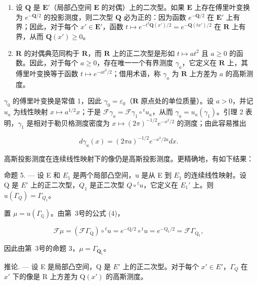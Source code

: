 \begin{enumerate}
\def\labelenumi{\arabic{enumi})}
\setcounter{enumi}{1}
\item
  设 \(\mathbf{Q}\) 是 \(\mathbf{E}'\)（局部凸空间 \(\mathbf{E}\) 的对偶）上的二次型。如果 \(\mathbf{E}\) 上存在傅里叶变换为 \(e^{-\mathbf{Q} / 2}\) 的投影测度，则二次型 \(\mathbf{Q}\) 必为正的：因为函数 \(e^{-\mathbf{Q} / 2}\) 在 \(\mathbf{E}'\) 上有界；因此，对于每个 \(x' \in \mathbf{E}'\)，函数 \(t \mapsto e^{-t^2\mathbf{Q}(x') / 2} = e^{-\mathbf{Q}(tx') / 2}\) 在 \(\mathbf{R}\) 上有界，从而 \(\mathbf{Q}(x') \geqslant 0\)。
\item
  \(\mathbf{R}\) 的对偶典范同构于 \(\mathbf{R}\)，而 \(\mathbf{R}\) 上的正二次型是形如 \(t \mapsto at^2\) 且 \(a \geqslant 0\) 的函数。因此，对于每个 \(a \geqslant 0\)，存在唯一一个有界测度 \(\gamma_a\)，它定义在 \(\mathbf{R}\) 上，其傅里叶变换等于函数 \(t \mapsto e^{-at^2/2}\)；借用术语，称 \(\gamma_a\) 为 \(\mathbf{R}\) 上方差为 \(a\) 的高斯测度。
\end{enumerate}

 \(\gamma_0\) 的傅里叶变换是常值 1，因此 \(\gamma_0 = \varepsilon_0\)（\(\mathbf{R}\) 原点处的单位质量）。设 \(a > 0\)，并记 \(u_a\) 为线性映射 \(x \mapsto a^{1/2}x\)；于是 \(\mathcal{F}\gamma_a = \mathcal{F}\gamma_1 \circ {}^t u_a\)，从而 \(\gamma_a = u_a(\gamma_1)\)。引理 2 表明，\(\gamma_1\) 是相对于勒贝格测度密度为 \(x \mapsto (2\pi)^{-1/2} e^{-x^2/2}\) 的测度；由此容易推出

\[
d \gamma_ {a} (x) = (2 \pi a) ^ {- 1 / 2} e ^ {- x ^ {2} / 2 a} d x.\tag{15}
\]

高斯投影测度在连续线性映射下的像仍是高斯投影测度。更精确地，有如下结果：

命题 5. --- 设 E 和 \(E_{1}\) 是两个局部凸空间，u 是从 E 到 \(E_{1}\) 的连续线性映射。设 Q 是 \(E'\) 上的正二次型，\(Q_{1}\) 是正二次型 \(Q \circ {}^{t}u\)，它定义在 \(E_{1}'\) 上。则 \(u(\Gamma_{Q}) = \Gamma_{Q_{1}}\)。

置 \(\mu = u(\Gamma_{\mathbb{Q}})\)。由第~3号的公式 (4)，

\[
\mathcal {F} \mu = \left(\mathcal {F} \Gamma_ {\mathrm{Q}}\right) \circ {} ^ {t} u = e ^ {- \mathrm{Q} / 2} \circ {} ^ {t} u = e ^ {- \mathrm{Q} _ {1} / 2} = \mathcal {F} \Gamma_ {\mathrm{Q} _ {1}},
\]

因此由第~3号的命题 3，\(\mu = \Gamma_{\mathbf{Q}_1}\)。

推论. --- 设 E 是局部凸空间，Q 是 \(E'\) 上的正二次型。对于每个 \(x' \in E'\)，\(\Gamma_{Q}\) 在 \(x'\) 下的像是 R 上方差为 \(\mathrm{Q}(x')\) 的高斯测度。

